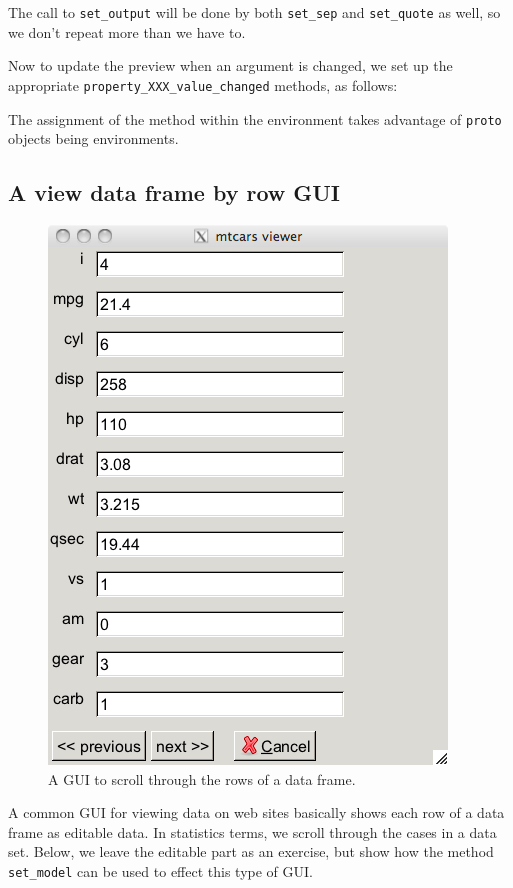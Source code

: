 \documentclass{article}
\newcommand{\code}[1]{\texttt{#1}} %
\newcommand{\generic}[1]{\code{#1}} %
\newcommand{\meth}[1]{\generic{#1}}     %
\newcommand{\pkg}[1]{\texttt{#1}}
\begin{document}
The call to \meth{set\_output} will be done by both \meth{set\_sep} and
\meth{set\_quote} as well, so we don't repeat more than we have to.

Now to update the preview when an argument is changed, we set up the
appropriate \code{property\_XXX\_value\_changed} methods, as follows:
\begin{Schunk}
\end{Schunk}
The assignment of the method within the environment takes advantage of
\pkg{proto} objects being environments.

\subsection{A view data frame by row GUI}
\label{sec:view-data-frame}

\begin{figure}
  \centering
  \includegraphics[width=.6\textwidth]{df-scroll}
  \caption{A GUI to scroll through the rows of a data frame.}
  \label{fig:df-scroll}
\end{figure}

A common GUI for viewing data on web sites basically shows each row of
a data frame as editable data. In statistics terms, we scroll through
the cases in a data set.  Below, we leave the editable part as an
exercise, but show how the method \meth{set\_model} can be used to
effect this type of GUI.
\end{document}
